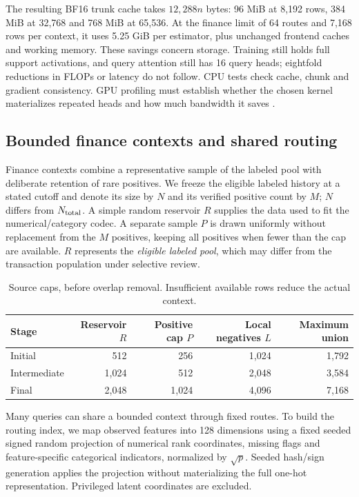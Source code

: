 \documentclass[11pt]{article}
\begin{document}
The resulting BF16 trunk cache takes $12{,}288n$ bytes: 96 MiB at 8,192 rows, 384 MiB at 32,768 and 768 MiB at 65,536. At the finance limit of 64 routes and 7,168 rows per context, it uses 5.25 GiB per estimator, plus unchanged frontend caches and working memory. These savings concern storage. Training still holds full support activations, and query attention still has 16 query heads; eightfold reductions in FLOPs or latency do not follow. CPU tests check cache, chunk and gradient consistency. GPU profiling must establish whether the chosen kernel materializes repeated heads and how much bandwidth it saves \cite{priorlabs-code,kumo-code}.

\subsection{Bounded finance contexts and shared routing}
\label{sec:finance-context}

Finance contexts combine a representative sample of the labeled pool with deliberate retention of rare positives. We freeze the eligible labeled history at a stated cutoff and denote its size by $N$ and its verified positive count by $M$; $N$ differs from $N_{\rm total}$. A simple random reservoir $R$ supplies the data used to fit the numerical/category codec. A separate sample $P$ is drawn uniformly without replacement from the $M$ positives, keeping all positives when fewer than the cap are available. $R$ represents the \emph{eligible labeled pool}, which may differ from the transaction population under selective review.

\begin{table}[ht]
\centering\small
\begin{tabular}{@{}lrrrr@{}}
\toprule Stage & Reservoir $R$ & Positive cap $P$ & Local negatives $L$ & Maximum union\\
\midrule
Initial & 512 & 256 & 1,024 & 1,792\\
Intermediate & 1,024 & 512 & 2,048 & 3,584\\
Final & 2,048 & 1,024 & 4,096 & 7,168\\
\bottomrule
\end{tabular}
\caption{Source caps, before overlap removal. Insufficient available rows reduce the actual context.}
\end{table}

Many queries can share a bounded context through fixed routes. To build the routing index, we map observed features into 128 dimensions using a fixed seeded signed random projection of numerical rank coordinates, missing flags and feature-specific categorical indicators, normalized by $\sqrt p$. Seeded hash/sign generation applies the projection without materializing the full one-hot representation. Privileged latent coordinates are excluded.
\end{document}
